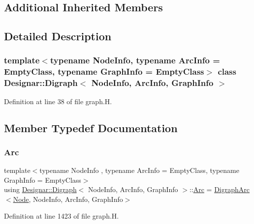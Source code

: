 \subsection*{Additional Inherited Members}


\subsection{Detailed Description}
\subsubsection*{template$<$typename Node\+Info, typename Arc\+Info = Empty\+Class, typename Graph\+Info = Empty\+Class$>$\newline
class Designar\+::\+Digraph$<$ Node\+Info, Arc\+Info, Graph\+Info $>$}



Definition at line 38 of file graph.\+H.



\subsection{Member Typedef Documentation}
\mbox{\label{class_designar_1_1_digraph_a0ceb278671f2a535c00fddccdeafd69f}} 
\subsubsection{\texorpdfstring{Arc}{Arc}}
{\footnotesize\ttfamily template$<$typename Node\+Info , typename Arc\+Info  = Empty\+Class, typename Graph\+Info  = Empty\+Class$>$ \\
using \hyperlink{class_designar_1_1_digraph}{Designar\+::\+Digraph}$<$ Node\+Info, Arc\+Info, Graph\+Info $>$\+::\hyperlink{class_designar_1_1_digraph_a0ceb278671f2a535c00fddccdeafd69f}{Arc} =  \hyperlink{class_designar_1_1_digraph_arc}{Digraph\+Arc}$<$\hyperlink{class_designar_1_1_digraph_a4dc921c41a480b7946a04170e997d8ae}{Node}, Node\+Info, Arc\+Info, Graph\+Info$>$}



Definition at line 1423 of file graph.\+H.

\mbox{\label{class_designar_1_1_digraph_a84a736f6c32da0fcbd1d047e74264d00}} 
